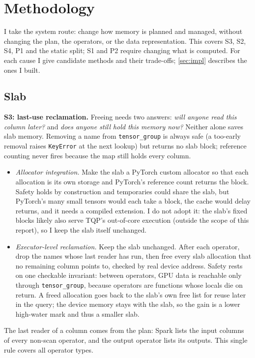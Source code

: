 \documentclass[10pt,twocolumn,letterpaper]{article}
\newcommand{\code}[1]{\texttt{\small #1}}
\begin{document}
\section{Methodology}
\label{sec:method}
I take the system route: change how memory is planned and managed, without changing
the plan, the operators, or the data representation. This covers S3, S2, S4, P1 and the
static split; S1 and P2 require changing what is computed. For each cause I give
candidate methods and their trade-offs; \cref{sec:impl} describes the ones I built.

\subsection{Slab}
\textbf{S3: last-use reclamation.} Freeing needs two answers: \emph{will anyone read
this column later?} and \emph{does anyone still hold this memory now?} Neither alone
saves slab memory. Removing a name from \code{tensor\_group} is always safe (a too-early
removal raises \code{KeyError} at the next lookup) but returns no slab block; reference
counting never fires because the map still holds every column.
\begin{itemize}
\item \emph{Allocator integration.} Make the slab a PyTorch custom allocator so that each
  allocation is its own storage and PyTorch's reference count returns the block. Safety
  holds by construction and temporaries could share the slab, but PyTorch's many small
  tensors would each take a block, the cache would delay returns, and it needs a compiled
  extension. I do not adopt it: the slab's fixed blocks likely also serve TQP's out-of-core
  execution (outside the scope of this report), so I keep the slab itself unchanged.
\item \emph{Executor-level reclamation.} Keep the slab unchanged. After each operator,
  drop the names whose last reader has run, then free every slab allocation that no
  remaining column points to, checked by real device address. Safety rests on one
  checkable invariant: between operators, GPU data is reachable only through
  \code{tensor\_group}, because operators are functions whose locals die on return.
  A freed allocation goes back to the slab's own free list for reuse later in the query;
  the device memory stays with the slab, so the gain is a lower high-water mark and thus
  a smaller slab.
\end{itemize}
The last reader of a column comes from the plan: Spark lists the input columns of every
non-scan operator, and the output operator lists its outputs. This single rule covers all
operator types.
\end{document}
